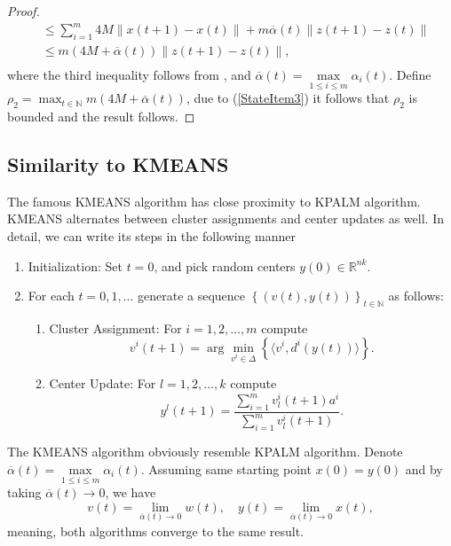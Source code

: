 \documentclass[11pt]{article}
\numberwithin{equation}{section}
\begin{document}
\begin{proof}
\begin{equation*}
\begin{aligned}
	& \leq \sum\limits_{i=1}^{m} 4M \| x(t+1) - x(t) \| + m \overline{\alpha}(t) \|z(t+1) - z(t)\| \\
	& \leq m \left( 4M + \overline{\alpha}(t) \right) \|z(t+1) - z(t)\| , \\
\end{aligned}
\end{equation*}
where the third inequality follows from , and $\overline{\alpha}(t) = \max\limits_{1 \leq i \leq m} \alpha_i(t)$. Define \\$\rho_2 = \max_{t\in \mathbb{N}} m \left( 4M + \overline{\alpha}(t) \right)$, due to (\ref{StateItem3}) it follows that $\rho_2$ is bounded and the result follows.
\end{proof}


\subsection{Similarity to KMEANS}
The famous KMEANS algorithm has close proximity to KPALM algorithm. KMEANS alternates between cluster assignments and center updates as well. In detail, we can write its steps in the following manner

\begin{enumerate}[(1)]
	\item Initialization: Set $t=0$, and pick random centers $y(0) \in \mathbb{R}^{nk}$.

	\item For each $t=0,1, \ldots$ generate a sequence $\left\lbrace(v(t),y(t))\right\rbrace_{t \in \mathbb{N}}$ as follows:
	\begin{enumerate}[(2.1)]
		\item Cluster Assignment: For $i=1, 2, \ldots ,m$ compute
		\begin{equation}
			v^i(t+1) = \arg\min\limits_{v^i \in \Delta} \left\lbrace \langle v^i , d^i(y(t)) \rangle\right\rbrace . \label{StateEq12}
		\end{equation}
		
		\item Center Update: For $l=1, 2, \ldots ,k$ compute
		\begin{equation}
			y^l(t+1) = \frac{\sum_{i=1}^{m} v^i_l(t+1) a^i}{\sum_{i=1}^{m} v^i_l(t+1)} . \label{StateEq13}
		\end{equation}
	\end{enumerate}
\end{enumerate}
The KMEANS algorithm obviously resemble KPALM algorithm. Denote $\overline{\alpha}(t) = \max\limits_{1 \leq i \leq m} \alpha_i(t)$. Assuming same starting point $x(0) = y(0)$ and by taking $\overline{\alpha}(t) \to 0$, we have
\begin{equation*}
	v(t) = \lim_{\overline{\alpha}(t) \to 0} w(t), \quad
	y(t) = \lim_{\overline{\alpha}(t) \to 0} x(t),
\end{equation*}
meaning, both algorithms converge to the same result.
\end{document}
